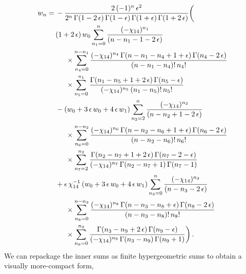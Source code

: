 \documentclass[aps,prd,preprint,groupedaddress,nofootinbib,showpacs,eqsecnum]{revtex4}
\def\eps{\epsilon}
\begin{document}
\begin{equation}
\begin{aligned}
w_n =\,&
-\frac{2\,(-1)^{n}\,\eps^{2}}
{2^{n}\,\Gamma(1-2\,\eps)\,\Gamma(1-\eps)\,\Gamma(1+\eps)\,\Gamma(1+2\,\eps)}
\biggl(
\\&
(1+2\,\eps)\,w_0
\sum_{n_1=0}^{n}\frac{(-\chi_{14})^{n_1}}
                     {(n-n_1-1-2\,\eps)}
\\&\indentB\times
\sum_{n_4=0}^{n-n_1}
   \frac{(-\chi_{14})^{n_4}\,\Gamma(n-n_1-n_4+1+\eps)\,\Gamma(n_4-2\,\eps)}
   {\left(n-n_1-n_4\right)!\,n_4!}\,
\\&\indentB\times
 \sum_{n_5=0}^{n_1}\frac{\Gamma(n_1-n_5+1+2\,\eps)\,\Gamma(n_5-\eps)}
                        {(-\chi_{14})^{n_5}\,(n_1-n_5)!\,n_5!}
\\&
{}-(w_0+3\,\eps\,w_0+4\,\eps\,w_1)
\sum_{n_2=2}^{n}\frac{(-\chi_{14})^{n_2}}
                     {(n-n_2+1-2\,\eps)}
\\&\indentB\times
  \sum_{n_6=0}^{n-n_2}
   \frac{(-\chi_{14})^{n_6}\,\Gamma(n-n_2-n_6+1+\eps)\,\Gamma(n_6-2\,\eps)}
        {\left(n-n_2-n_6\right)!\,n_6!}\,
\\&\indentB\times
 \sum_{n_7=2}^{n_2}\frac{\Gamma(n_2-n_7+1+2\,\eps)\,\Gamma(n_7-2-\eps)}
      {(-\chi_{14})^{n_7}\,\Gamma(n_2-n_7+1)\,\Gamma(n_7-1)}
\indentN %
\\ &
+\eps\,\chi_{14}^{-1}\,(w_0+3\,\eps\,w_0+4\,\eps\,w_1)
\sum_{n_3=0}^{n}\frac{(-\chi_{14})^{n_3}}
                     {(n-n_3-2\,\eps)}
\\&\indentB\times
\sum_{n_8=0}^{n-n_3}
  \frac{(-\chi_{14})^{n_8}\,\Gamma(n-n_3-n_8+\eps)\,\Gamma(n_8-2\,\eps)}
   {\left(n-n_3-n_8\right)!\,n_8!}
\\&\indentB\times
\sum_{n_9=0}^{n_3}\frac{\Gamma(n_3-n_9+2\,\eps)\,\Gamma(n_9-\eps)}
                       {(-\chi_{14})^{n_9}\,\Gamma(n_3-n_9)\,\Gamma(n_9+1)}
\indentN %
\biggr)
\,.
\end{aligned}
\label{DoubleBoxGeneralTermI}
\end{equation}
We can repackage the inner sums as finite hypergeometric sums to
obtain a visually more-compact form,
\end{document}
